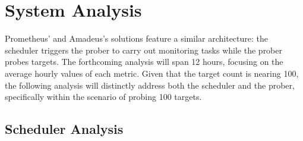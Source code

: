 \section{System Analysis}

Prometheus' and Amadeus's solutions feature a similar architecture: the scheduler triggers the prober to carry out monitoring tasks while the prober probes targets. The forthcoming analysis will span 12 hours, focusing on the average hourly values of each metric. Given that the target count is nearing 100, the following analysis will distinctly address both the scheduler and the prober, specifically within the scenario of probing 100 targets. 

\subsection{Scheduler Analysis}


